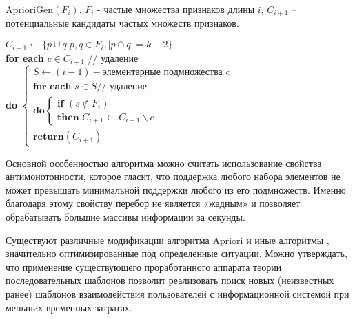 

AprioriGen$(F_i)$. $F_i$ - частые множества признаков длины $i$, $C_{i+1}$ -- потенциальные кандидаты частых множеств признаков.

\noindent
$C_{i+1} \leftarrow \{p \cup q | p, q \in F_i,| p \cap q| = k-2 \}$ \\
\textbf{for each} $c \in C_{i+1}$ // удаление \\
\textbf{do}
$\begin{cases}
	S \leftarrow (i-1)-\text{элементарные подмножества } c\\
	\textbf{for each } s \in S \text{// удаление} \\
	\textbf{do} 
	\begin{cases}
		\textbf{if } (s \notin F_i)\\
		\textbf{then } C_{i+1} \leftarrow C_{i+1} \backslash c
	\end{cases} \\
	\textbf{return} (C_{i+1})
\end{cases}$

Основной особенностью алгоритма можно считать использование свойства антимонотонности, которое гласит, что поддержка любого набора элементов не может превышать минимальной поддержки любого из его подмножеств. Именно благодаря этому свойству перебор не является «жадным» и позволяет обрабатывать большие массивы информации за секунды.

Существуют различные модификации алгоритма Apriori и иные алгоритмы \cite{35}, значительно оптимизированные под определенные ситуации. Можно утверждать, что применение существующего проработанного аппарата теории последовательных шаблонов позволит реализовать поиск новых (неизвестных ранее) шаблонов взаимодействия пользователей с информационной системой при меньших временных затратах.

